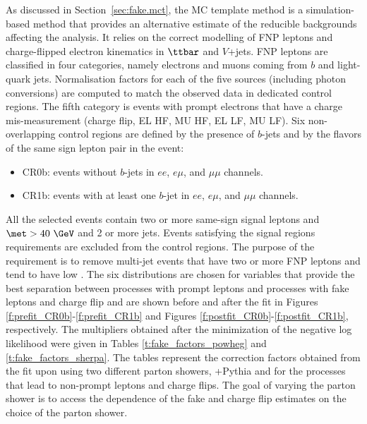 As discussed in Section~\ref{sec:fake.mct}, the MC template method is
 a simulation-based method that provides an alternative estimate of the reducible backgrounds affecting the analysis.
It relies on the correct modelling of FNP leptons and charge-flipped electron kinematics in $\ttbar$ 
and $V$+jets.
FNP leptons are classified in four categories, namely electrons and muons coming 
from $b$ and light-quark jets. Normalisation factors for each of the five sources (including photon conversions) are computed to match the observed data 
in dedicated control regions. The fifth category is events with prompt electrons that have a charge mis-measurement 
(charge flip, EL HF, MU HF, EL LF, MU LF).
Six non-overlapping control regions are defined by the presence of $b$-jets and by the flavors of the same sign lepton pair in the event:
\begin{itemize}
\item CR0b: events without $b$-jets in $ee$, $e\mu$, and $\mu\mu$ channels.
\item CR1b: events with at least one $b$-jet in $ee$, $e\mu$, and $\mu\mu$ channels.
\end{itemize}
All the selected events contain two or more same-sign signal leptons and \\$\met >40~\GeV$ and 2 or more jets. 
Events satisfying the signal regions requirements are excluded from the control regions. 
The purpose of the \met requirement is to remove multi-jet events that have two or more FNP leptons and tend to have low \met. 
The six distributions are chosen for variables that provide the best separation between processes with prompt leptons and processes with 
fake leptons and charge flip and are shown 
before and after the fit in Figures \ref{f:prefit_CR0b}-\ref{f:prefit_CR1b} and Figures \ref{f:postfit_CR0b}-\ref{f:postfit_CR1b}, 
respectively. 
The multipliers obtained after the minimization of the negative log likelihood were given 
in Tables \ref{t:fake_factors_powheg} and \ref{t:fake_factors_sherpa}.
The tables represent the correction factors obtained from the fit upon using two different parton showers, \POWHEGBOX+Pythia and \SHERPA
for the processes that lead to non-prompt leptons and charge flips.
The goal of varying the parton shower is to access the dependence of the fake and charge flip estimates on the choice of the 
parton shower. 

